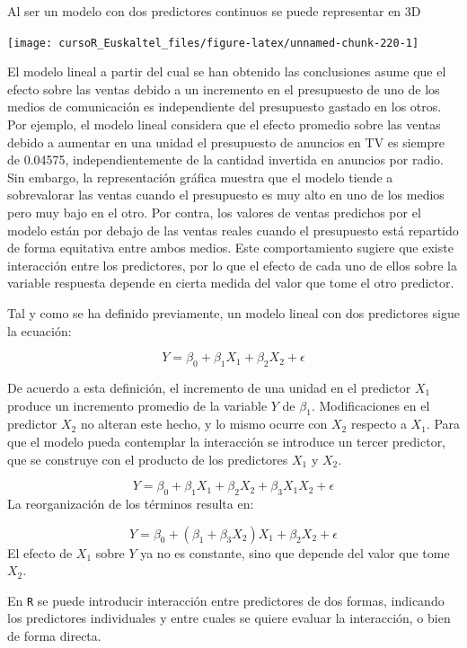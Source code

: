 \documentclass[]{book}
\begin{document}
Al ser un modelo con dos predictores continuos se puede representar en
3D

\begin{center}\texttt{[image: cursoR\_Euskaltel\_files/figure-latex/unnamed-chunk-220-1]} \end{center}

El modelo lineal a partir del cual se han obtenido las conclusiones
asume que el efecto sobre las ventas debido a un incremento en el
presupuesto de uno de los medios de comunicación es independiente del
presupuesto gastado en los otros. Por ejemplo, el modelo lineal
considera que el efecto promedio sobre las ventas debido a aumentar en
una unidad el presupuesto de anuncios en TV es siempre de 0.04575,
independientemente de la cantidad invertida en anuncios por radio. Sin
embargo, la representación gráfica muestra que el modelo tiende a
sobrevalorar las ventas cuando el presupuesto es muy alto en uno de los
medios pero muy bajo en el otro. Por contra, los valores de ventas
predichos por el modelo están por debajo de las ventas reales cuando el
presupuesto está repartido de forma equitativa entre ambos medios. Este
comportamiento sugiere que existe interacción entre los predictores, por
lo que el efecto de cada uno de ellos sobre la variable respuesta
depende en cierta medida del valor que tome el otro predictor.

Tal y como se ha definido previamente, un modelo lineal con dos
predictores sigue la ecuación:

\[
Y={\beta}_0+ \beta_1 X_1+ \beta_2 X_2+ \epsilon
\]

De acuerdo a esta definición, el incremento de una unidad en el
predictor \(X_1\) produce un incremento promedio de la variable \(Y\) de
\(\beta_1\). Modificaciones en el predictor \(X_2\) no alteran este
hecho, y lo mismo ocurre con \(X_2\) respecto a \(X_1\). Para que el
modelo pueda contemplar la interacción se introduce un tercer predictor,
que se construye con el producto de los predictores \(X_1\) y \(X_2\).

\[
Y=\beta_0+\beta_1 X_1+\beta_2 X_2+ \beta_3 X_1X_2+\epsilon
\] La reorganización de los términos resulta en:

\[
  Y=\beta_0+(\beta_1+\beta_3 X_2)X_1+\beta_2X_2+\epsilon
\] El efecto de \(X_1\) sobre \(Y\) ya no es constante, sino que depende
del valor que tome \(X_2\).

En \texttt{R} se puede introducir interacción entre predictores de dos
formas, indicando los predictores individuales y entre cuales se quiere
evaluar la interacción, o bien de forma directa.
\end{document}
